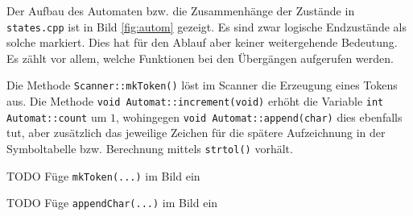 \documentclass[
a4paper,   %
11pt,      %
oneside,   %
onecolumn, %
final      %
]{article}
\newcommand{\code}[1]{\lstinline$#1$}
\begin{document}
Der Aufbau des Automaten bzw. die Zusammenhänge der Zustände in \texttt{states.cpp} ist in Bild \ref{fig:autom} gezeigt. Es sind zwar logische Endzustände als solche markiert. Dies hat für den Ablauf aber keiner weitergehende Bedeutung. Es zählt vor allem, welche Funktionen bei den Übergängen aufgerufen werden.

Die Methode \code{Scanner::mkToken()} löst im Scanner die Erzeugung eines Tokens aus. Die Methode \code{void Automat::increment(void)} erhöht die Variable \code{int Automat::count} um $1$, wohingegen \code{void Automat::append(char)} dies ebenfalls tut, aber zusätzlich das jeweilige Zeichen für die spätere Aufzeichnung in der Symboltabelle bzw. Berechnung mittels \code{strtol()} vorhält.

TODO Füge \code{mkToken(...)} im Bild ein

TODO Füge \code{appendChar(...)} im Bild ein

\end{document}

